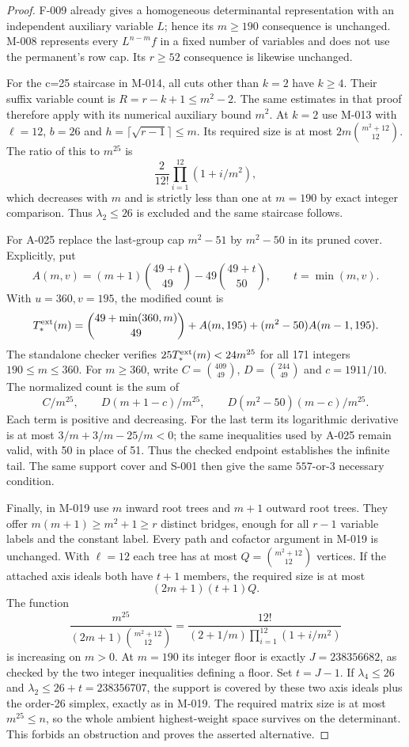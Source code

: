 \begin{proof}
F-009 already gives a homogeneous determinantal representation with an
independent auxiliary variable $L$; hence its $m\geq190$ consequence
is unchanged. M-008 represents every $L^{n-m}f$ in a fixed number of
variables and does not use the permanent's row cap. Its $r\geq52$
consequence is likewise unchanged.

For the c=25 staircase in M-014, all cuts other than $k=2$ have $k\geq4$.
Their suffix variable count is $R=r-k+1\leq m^2-2$. The same estimates
in that proof therefore apply with its numerical auxiliary bound $m^2$.
At $k=2$ use M-013 with $\ell=12$, $b=26$ and
$h=\lceil\sqrt{r-1}\rceil\leq m$. Its required size is at most
$2m\binom{m^2+12}{12}$. The ratio of this to $m^{25}$ is
\[
               \frac2{12!}\prod_{i=1}^{12}(1+i/m^2),
\]
which decreases with $m$ and is strictly less than one at $m=190$ by
exact integer comparison. Thus $\lambda_2\leq26$ is excluded and the
same staircase follows.

For A-025 replace the last-group cap $m^2-51$ by $m^2-50$ in its
pruned cover. Explicitly, put
\[
 A(m,v)=(m+1)\binom{49+t}{49}-49\binom{49+t}{50},\qquad t=\min(m,v).
\]
With $u=360,v=195$, the modified count is
\[
 T^{\rm ext}_*(m)=\binom{49+\min(360,m)}{49}
       +A(m,195)+(m^2-50)A(m-1,195).
\]
The standalone checker verifies
$25T^{\rm ext}_*(m)<24m^{25}$ for all 171 integers $190\leq m\leq360$.
For $m\geq360$, write $C=\binom{409}{49}$,
$D=\binom{244}{49}$ and $c=1911/10$. The normalized count is the sum of
\[
 C/m^{25},\qquad D(m+1-c)/m^{25},\qquad
                 D(m^2-50)(m-c)/m^{25}.
\]
Each term is positive and decreasing. For the last term its logarithmic
derivative is at most
$3/m+3/m-25/m<0$; the same inequalities used by A-025 remain valid,
with 50 in place of 51. Thus the checked endpoint establishes the
infinite tail. The same support cover and S-001 then give the same
$557$-or-$3$ necessary condition.

Finally, in M-019 use $m$ inward root trees and $m+1$ outward root trees.
They offer $m(m+1)\geq m^2+1\geq r$ distinct bridges, enough for all
$r-1$ variable labels and the constant label. Every path and cofactor
argument in M-019 is unchanged. With $\ell=12$ each tree has at most
$Q=\binom{m^2+12}{12}$ vertices. If the attached axis ideals both have
$t+1$ members, the required size is at most
\[
                         (2m+1)(t+1)Q.
\]
The function
\[
 \frac{m^{25}}{(2m+1)\binom{m^2+12}{12}}
       =\frac{12!}{(2+1/m)\prod_{i=1}^{12}(1+i/m^2)}
\]
is increasing on $m>0$. At $m=190$ its integer floor is exactly
$J=238356682$, as checked by the two integer inequalities defining a
floor. Set $t=J-1$. If $\lambda_4\leq26$ and
$\lambda_2\leq26+t=238356707$, the support is covered by these two
axis ideals plus the order-26 simplex, exactly as in M-019. The required
matrix size is at most $m^{25}\leq n$, so the whole ambient highest-weight
space survives on the determinant. This forbids an obstruction and
proves the asserted alternative.
\end{proof}

